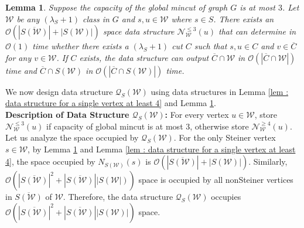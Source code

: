 \documentclass[letterpaper,11pt]{article}
\newtheorem{lemma}{Lemma}[]
\begin{document}
\begin{lemma} \label{lem : data structure for a single vertex at most 3}
    Suppose the capacity of the global mincut of graph $G$ is at most $3$. Let ${\mathcal W}$ be any $(\lambda_S+1)$ class in $G$ and $s,u\in {\mathcal W}$ where $s\in S$. There exists an $\mathcal{O}(|\overline{S({\mathcal W})}|+|S({\mathcal W})|)$ space data structure ${\mathcal N}^{\le 3}_{\mathcal W}(u)$ that can determine in ${\mathcal O}(1)$ time whether there exists a $(\lambda_S+1)$ cut $C$ such that $s,u\in C$ and $v\in \overline{C}$ for any $v \in {\mathcal W}$. If $C$ exists, the data structure can output $\overline{C}\cap {\mathcal W}$ in ${\mathcal{O}}(|\overline{C}\cap {\mathcal W}|)$ time and $\overline{C}\cap S({\mathcal{W}})$ in ${\mathcal{O}}(|\overline{C}\cap S({\mathcal{W}})|)$ time. 
\end{lemma}
We now design data structure ${\mathcal Q}_S({\mathcal W})$ using data structures in Lemma \ref{lem : data structure for a single vertex at least 4} and Lemma \ref{lem : data structure for a single vertex at most 3}.\\

\noindent
\textbf{Description of Data Structure ${\mathcal Q}_S({\mathcal W})$:} For every vertex $u\in {\mathcal W}$, store ${\mathcal N}^{\le 3}_{\mathcal W}(u)$ if capacity of global mincut is at most $3$, otherwise store ${\mathcal N}^{\ge 4}_{\mathcal W}(u)$.\\

Let us analyze the space occupied by ${\mathcal Q}_S({\mathcal W})$. For the only Steiner vertex $s\in {\mathcal W}$, by Lemma \ref{lem : data structure for a single vertex at most 3} and Lemma \ref{lem : data structure for a single vertex at least 4}, the space occupied by $N_{S({\mathcal W})}(s)$ is ${\mathcal O}(|\overline{S({\mathcal W})}|+|S({\mathcal W})|)$. Similarly, ${\mathcal O}(|\overline{S({\mathcal W})}|^2+|\overline{S({\mathcal W})}||S({\mathcal W}|))$ space is occupied by all nonSteiner vertices in $\overline{S({\mathcal W})}$ of ${\mathcal W}$.
Therefore, the data structure ${\mathcal Q}_S({\mathcal W})$ occupies ${\mathcal O}(|\overline{S({\mathcal W})}|^2+|\overline{S({\mathcal W})}||S({\mathcal W})|)$ space.\\
\end{document}

